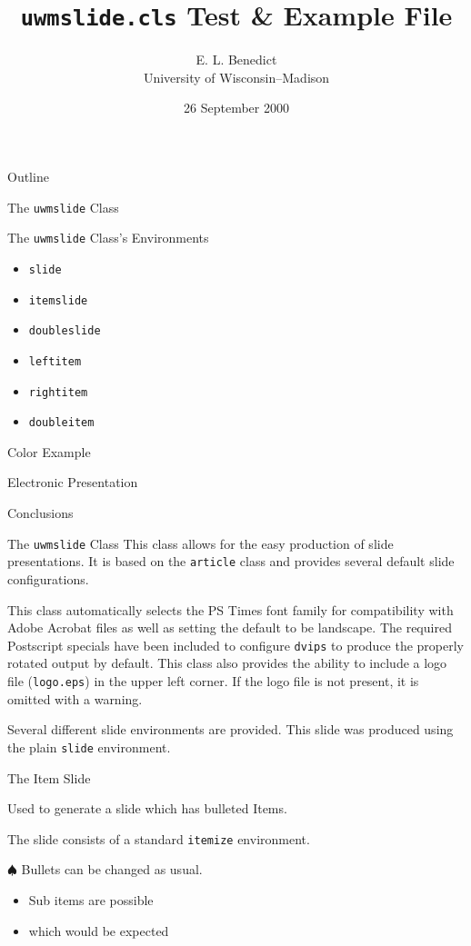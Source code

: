 \documentclass{uwmslide}
\title{{\tt uwmslide.cls} Test \& Example File}
\author{E. L. Benedict \\University of Wisconsin--Madison}
\date{26 September 2000}
\begin{document}
\textBlack
\maketitle


\begin{itemslide}{Outline}
\item The {\tt uwmslide} Class
\item The {\tt uwmslide} Class's Environments
\begin{itemize}
\item {\tt  slide}
\item {\tt  itemslide}
\item {\tt  doubleslide}
\item {\tt  leftitem}
\item {\tt  rightitem}
\item {\tt  doubleitem}
\end{itemize}
\item Color Example
\item Electronic Presentation
\item Conclusions
\end{itemslide}

\begin{slide}{The {\tt uwmslide} Class}
This \LaTeXe{} class allows for the easy production of slide presentations.
It is based on the {\tt article} class and provides several default slide
configurations.

This class automatically selects the PS Times font family for compatibility
with Adobe Acrobat files as well as setting the default to be landscape.
The required Postscript specials have been included to configure {\tt dvips}
to produce the properly rotated output by default.  This class also provides
the ability to include a logo file ({\tt logo.eps}) in the upper left corner.  
If the logo file is not present, it is omitted with a warning.

Several different slide environments are provided.  This slide was produced
using the plain {\tt slide} environment.
\end{slide}

\begin{itemslide}{The Item Slide}
\item Used to generate a slide which has bulleted Items.
\item The slide consists of a standard {\tt itemize} environment.
\item[$\spadesuit$] Bullets can be changed as usual.
\begin{itemize}
\item Sub items are possible
\item which would be expected
\end{itemize}
\end{itemslide}
\end{document}
